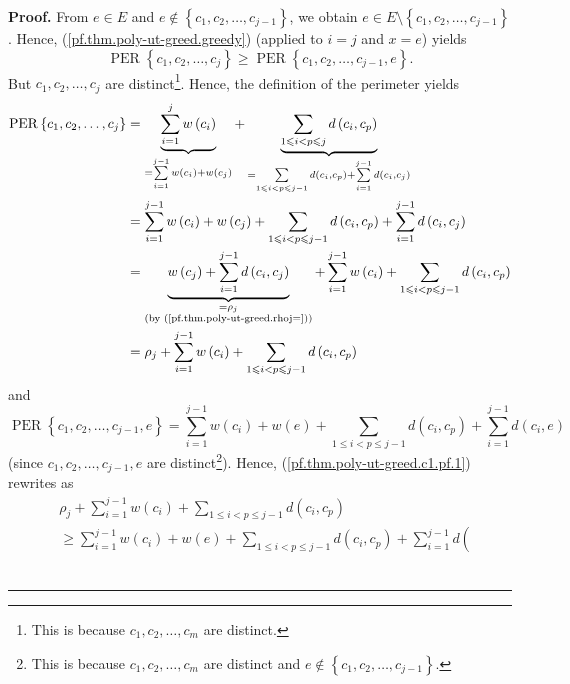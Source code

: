 \documentclass[numbers=enddot,12pt,final,onecolumn,notitlepage]{scrartcl}%
\theoremstyle{definition}
\newenvironment{proof}[1][Proof]{\noindent\textbf{#1.} }{\ \rule{0.5em}{0.5em}}
\let\sumnonlimits\sum
\renewcommand{\sum}{\sumnonlimits\limits}
\renewcommand{\leq}{\leqslant}
\renewcommand{\geq}{\geqslant}
\theoremstyle{plainsl}
\begin{document}
\begin{proof}
From $e\in E$ and $e\notin\left\{  c_{1},c_{2},\ldots,c_{j-1}\right\}  $, we
obtain $e\in E\setminus\left\{  c_{1},c_{2},\ldots,c_{j-1}\right\}  $. Hence,
(\ref{pf.thm.poly-ut-greed.greedy}) (applied to $i=j$ and $x=e$) yields%
\begin{equation}
\operatorname*{PER}\left\{  c_{1},c_{2},\ldots,c_{j}\right\}  \geq
\operatorname*{PER}\left\{  c_{1},c_{2},\ldots,c_{j-1},e\right\}  .
\label{pf.thm.poly-ut-greed.c1.pf.1}%
\end{equation}
But $c_{1},c_{2},\ldots,c_{j}$ are distinct\footnote{This is because
$c_{1},c_{2},\ldots,c_{m}$ are distinct.}. Hence, the definition of the
perimeter yields%
\begin{align*}
\operatorname*{PER}\left\{  c_{1},c_{2},\ldots,c_{j}\right\}   &
=\underbrace{\sum_{i=1}^{j}w\left(  c_{i}\right)  }_{=\sum_{i=1}^{j-1}w\left(
c_{i}\right)  +w\left(  c_{j}\right)  }+\underbrace{\sum_{1\leq i<p\leq
j}d\left(  c_{i},c_{p}\right)  }_{=\sum_{1\leq i<p\leq j-1}d\left(
c_{i},c_{p}\right)  +\sum_{i=1}^{j-1}d\left(  c_{i},c_{j}\right)  }\\
&  =\sum_{i=1}^{j-1}w\left(  c_{i}\right)  +w\left(  c_{j}\right)
+\sum_{1\leq i<p\leq j-1}d\left(  c_{i},c_{p}\right)  +\sum_{i=1}%
^{j-1}d\left(  c_{i},c_{j}\right) \\
&  =\underbrace{w\left(  c_{j}\right)  +\sum_{i=1}^{j-1}d\left(  c_{i}%
,c_{j}\right)  }_{\substack{=\rho_{j}\\\text{(by
(\ref{pf.thm.poly-ut-greed.rhoj=}))}}}+\sum_{i=1}^{j-1}w\left(  c_{i}\right)
+\sum_{1\leq i<p\leq j-1}d\left(  c_{i},c_{p}\right) \\
&  =\rho_{j}+\sum_{i=1}^{j-1}w\left(  c_{i}\right)  +\sum_{1\leq i<p\leq
j-1}d\left(  c_{i},c_{p}\right)
\end{align*}
and%
\[
\operatorname*{PER}\left\{  c_{1},c_{2},\ldots,c_{j-1},e\right\}  =\sum
_{i=1}^{j-1}w\left(  c_{i}\right)  +w\left(  e\right)  +\sum_{1\leq i<p\leq
j-1}d\left(  c_{i},c_{p}\right)  +\sum_{i=1}^{j-1}d\left(  c_{i},e\right)
\]
(since $c_{1},c_{2},\ldots,c_{j-1},e$ are distinct\footnote{This is because
$c_{1},c_{2},\ldots,c_{m}$ are distinct and $e\notin\left\{  c_{1}%
,c_{2},\ldots,c_{j-1}\right\}  $.}). Hence,
(\ref{pf.thm.poly-ut-greed.c1.pf.1}) rewrites as%
\begin{align*}
&  \rho_{j}+\sum_{i=1}^{j-1}w\left(  c_{i}\right)  +\sum_{1\leq i<p\leq
j-1}d\left(  c_{i},c_{p}\right) \\
&  \geq\sum_{i=1}^{j-1}w\left(  c_{i}\right)  +w\left(  e\right)  +\sum_{1\leq
i<p\leq j-1}d\left(  c_{i},c_{p}\right)  +\sum_{i=1}^{j-1}d\left(

\end{align*}
\end{proof}
\end{document}
